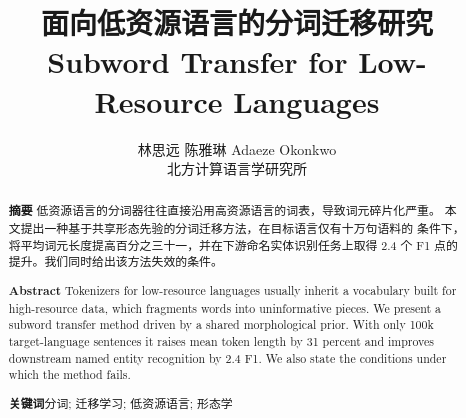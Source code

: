 \documentclass[11pt,fontset=fandol,UTF8]{ctexart}
\title{面向低资源语言的分词迁移研究\\
\large Subword Transfer for Low-Resource Languages}
\author{林思远 \quad 陈雅琳 \quad Adaeze Okonkwo\\
\normalsize 北方计算语言学研究所}
\date{}
\begin{document}
\maketitle

\begin{abstract}
\noindent
\textbf{摘要}\quad
低资源语言的分词器往往直接沿用高资源语言的词表，导致词元碎片化严重。
本文提出一种基于共享形态先验的分词迁移方法，在目标语言仅有十万句语料的
条件下，将平均词元长度提高百分之三十一，并在下游命名实体识别任务上取得
2.4 个 F1 点的提升。我们同时给出该方法失效的条件。

\vspace{0.6em}
\noindent
\textbf{Abstract}\quad
Tokenizers for low-resource languages usually inherit a vocabulary built for
high-resource data, which fragments words into uninformative pieces. We present
a subword transfer method driven by a shared morphological prior. With only
100k target-language sentences it raises mean token length by 31 percent and
improves downstream named entity recognition by 2.4 F1. We also state the
conditions under which the method fails.

\vspace{0.6em}
\noindent\textbf{关键词}\quad 分词; 迁移学习; 低资源语言; 形态学
\end{abstract}








\end{document}
